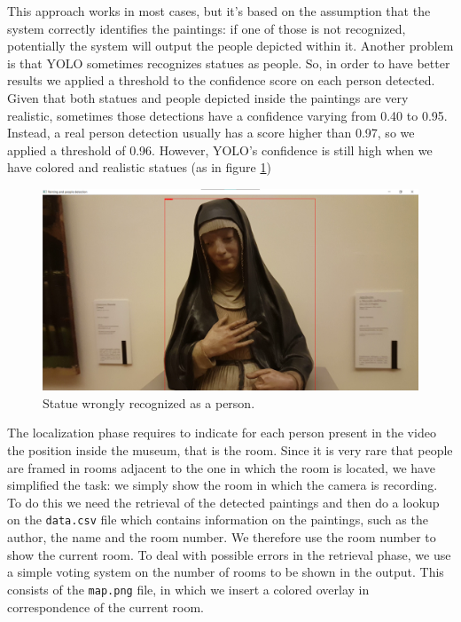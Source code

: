 \documentclass[10pt,twocolumn,letterpaper]{article}
\begin{document}
This approach works in most cases, but it's based on the assumption that the system correctly identifies the paintings: if one of those is not recognized, potentially the system will output the people depicted within it. Another problem is that YOLO sometimes recognizes statues as people. So, in order to have better results we applied a threshold to the confidence score on each person detected. Given that both statues and people depicted inside the paintings are very realistic, sometimes those detections have a confidence varying from 0.40 to 0.95. Instead, a real person detection usually has a score higher than 0.97, so we applied a threshold of 0.96. However, YOLO's confidence is still high when we have colored and realistic statues (as in figure \ref{fig:PeopleDetectionError})

\begin{figure}[t]
\begin{center}
\includegraphics[width=\linewidth]{images/madonna.png}
\end{center}
\caption{Statue wrongly recognized as a person.}
\label{fig:PeopleDetectionError}
\end{figure}

The localization phase requires to indicate for each person present in the video the position inside the museum, that is the room. Since it is very rare that people are framed in rooms adjacent to the one in which the room is located, we have simplified the task: we simply show the room in which the camera is recording. To do this we need the retrieval of the detected paintings and then do a lookup on the \texttt{data.csv} file which contains information on the paintings, such as the author, the name and the room number. We therefore use the room number to show the current room. To deal with possible errors in the retrieval phase, we use a simple voting system on the number of rooms to be shown in the output. This consists of the \texttt{map.png} file, in which we insert a colored overlay in correspondence of the current room.
\end{document}
